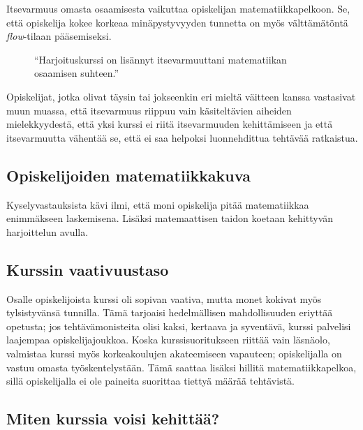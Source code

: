 \documentclass[a4paper,12pt,leqno,titlepage]{article}
\begin{document}
Itsevarmuus omasta osaamisesta vaikuttaa opiskelijan matematiikkapelkoon.
Se, että opiskelija kokee korkeaa minäpystyvyyden tunnetta on myös välttämätöntä \emph{flow}-tilaan pääsemiseksi.

\begin{figure}[h!]
\centering
{}
\caption{``Harjoituskurssi on lisännyt itsevarmuuttani matematiikan osaamisen suhteen.''}
\end{figure}

Opiskelijat, jotka olivat täysin tai jokseenkin eri mieltä väitteen kanssa vastasivat muun muassa, että itsevarmuus riippuu vain käsiteltävien aiheiden mielekkyydestä, että yksi kurssi ei riitä itsevarmuuden kehittämiseen ja että itsevarmuutta vähentää se, että ei saa helpoksi luonnehdittua tehtävää ratkaistua.


\subsection{Opiskelijoiden matematiikkakuva}
Kyselyvastauksista kävi ilmi, että moni opiskelija pitää matematiikkaa enimmäkseen laskemisena.
Lisäksi matemaattisen taidon koetaan kehittyvän harjoittelun avulla.


\subsection{Kurssin vaativuustaso}
Osalle opiskelijoista kurssi oli sopivan vaativa, mutta monet kokivat myös tylsistyvänsä tunnilla.
Tämä tarjoaisi hedelmällisen mahdollisuuden eriyttää opetusta; jos tehtävämonisteita olisi kaksi, kertaava ja syventävä, kurssi palvelisi laajempaa opiskelijajoukkoa.
Koska kurssisuoritukseen riittää vain läsnäolo, valmistaa kurssi myös korkeakoulujen akateemiseen vapauteen; opiskelijalla on vastuu omasta työskentelystään.
Tämä saattaa lisäksi hillitä matematiikkapelkoa, sillä opiskelijalla ei ole paineita suorittaa tiettyä määrää tehtävistä.

\subsection{Miten kurssia voisi kehittää?}
\end{document}
